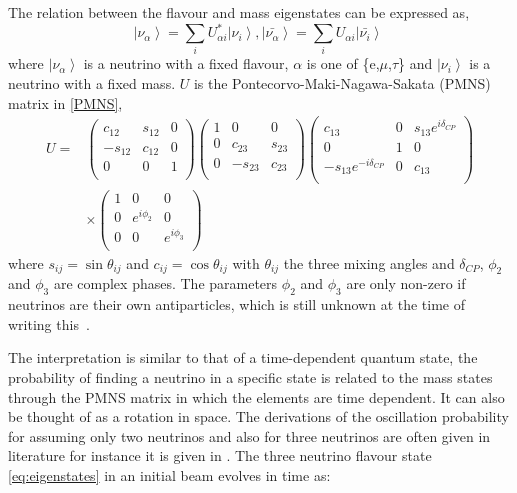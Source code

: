 The relation between the flavour and mass eigenstates can be expressed as,
\begin{equation}
\label{eq:eigenstates}
 \left| \nu_\alpha \right\rangle = \sum_{i} U^{*}_{\alpha i} \left| \nu_i \right\rangle,
 \left| \bar{\nu_\alpha} \right\rangle = \sum_{i} U_{\alpha i} \left| \bar{\nu_i} \right\rangle\
 \end{equation}
where
 $\left| \nu_\alpha \right\rangle $ is a neutrino with a fixed flavour, $\alpha$ is one of \{e,$\mu$,$\tau$\} and  $\left| \nu_i \right\rangle$ is a neutrino with a fixed mass.
$U$ is the Pontecorvo-Maki-Nagawa-Sakata (PMNS) matrix in \eqref{PMNS},
\begin{equation}
\label{PMNS}
\begin{aligned}
U ={} & 
 \begin{pmatrix}
 c_{12} & s_{12} & 0\\
  -s_{12} & c_{12} & 0\\
  0 & 0 & 1\\
 \end{pmatrix} 
  \begin{pmatrix}
 1 & 0 & 0\\
  0 & c_{23} & s_{23}\\
  0 & -s_{23} & c_{23}\\
 \end{pmatrix} 
   \begin{pmatrix}
 c_{13} & 0 & s_{13}e^{i\delta_{CP}}\\
  0 & 1 & 0\\
  -s_{13}e^{-i\delta_{CP}} & 0 & c_{13}\\
 \end{pmatrix} 
 \\
 & \times
  \begin{pmatrix}
1 & 0& 0\\
  0 & e^{i\phi_2} & 0\\
  0 & 0 & e^{i\phi_3}\\
 \end{pmatrix} 
 \end{aligned}
\end{equation}
where $s_{ij} = \sin\theta_{ij}$ and $c_{ij} = \cos\theta_{ij}$ with $\theta_{ij}$ the three mixing angles and $\delta_{CP}$, $\phi_2$ and $\phi_3$ are complex phases. The parameters $\phi_2$ and $\phi_3$ are only non-zero if neutrinos are their own antiparticles, which is still unknown at the time of writing this~\cite{13PDG}.

The interpretation is similar to that of a time-dependent quantum state, the probability of finding a neutrino in a specific state is related to the mass states through the PMNS matrix in which the elements are time dependent. It can also be thought of as a rotation in space. The derivations of the oscillation probability for assuming only two neutrinos and also for three neutrinos are often given in literature for instance it is given in \cite{34doi:10.1142/9789812562203_0002}. The three neutrino flavour state \ref{eq:eigenstates} in an initial beam evolves in time as:

